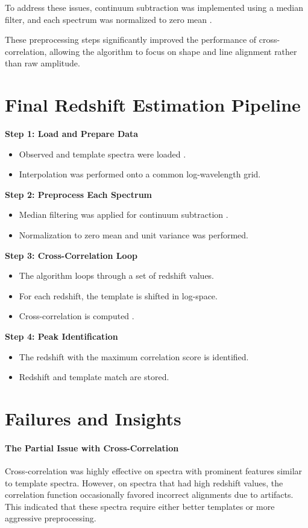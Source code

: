 \documentclass[12pt]{article}
\begin{document}
To address these issues, continuum subtraction was implemented using a median filter, and each spectrum was normalized to zero mean \cite{scipy}.

These preprocessing steps significantly improved the performance of cross-correlation, allowing the algorithm to focus on shape and line alignment rather than raw amplitude.

\section{Final Redshift Estimation Pipeline}

\textbf{Step 1: Load and Prepare Data}
\begin{itemize}
\item Observed and template spectra were loaded \cite{astropy}.
\item Interpolation was performed onto a common log-wavelength grid.
\end{itemize}

\textbf{Step 2: Preprocess Each Spectrum}
\begin{itemize}
\item Median filtering was applied for continuum subtraction \cite{scipy}.
\item Normalization to zero mean and unit variance was performed.
\end{itemize}

\textbf{Step 3: Cross-Correlation Loop}
\begin{itemize}
\item The algorithm loops through a set of redshift values.
\item For each redshift, the template is shifted in log-space.
\item Cross-correlation is computed \cite{nayar_template_matching}.
\end{itemize}

\textbf{Step 4: Peak Identification}
\begin{itemize}
\item The redshift with the maximum correlation score is identified.
\item Redshift and template match are stored.
\end{itemize}

\section{Failures and Insights}

\paragraph{The Partial Issue with Cross-Correlation}
Cross-correlation was highly effective on spectra with prominent features similar to template spectra. However, on spectra that had high redshift values, the correlation function occasionally favored incorrect alignments due to artifacts. This indicated that these spectra require either better templates or more aggressive preprocessing.
\end{document}
